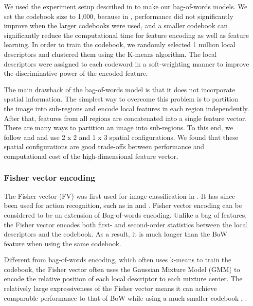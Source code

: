 We used the experiment setup described in \cite{jiang2010representations} to make our bag-of-words models. We set the codebook size to 1,000, because in \cite{jiang2010representations}, performance did not significantly improve when the larger codebooks were used, and a smaller codebook can significantly reduce the computational time for feature encoding as well as feature learning. In order to train the codebook, we randomly selected 1 million local descriptors and clustered them using the K-means algorithm. The local descriptors were assigned to each codeword in a soft-weighting manner \cite{jiang2007towards} to improve the discriminative power of the encoded feature.

The main drawback of the bag-of-words model is that it does not incorporate spatial information. The simplest way to overcome this problem is to partition the image into sub-regions and encode local features in each region independently. After that, features from all regions are concatenated into a single feature vector. There are many ways to partition an image into sub-regions. To this end, we follow \cite{jiang2010representations} and \cite{lazebnik2006beyond} and use 2 x 2 and 1 x 3 spatial configurations. We found that these spatial configurations are good trade-offs between performance and computational cost of the high-dimensional feature vector.

\subsubsection{Fisher vector encoding}
The Fisher vector (FV) was first used for image classification in \cite{jaakkola1999exploiting}. It has since been used for action recognition, such as in \cite{sun2013large} and \cite{wang2013action}. Fisher vector encoding can be considered to be an extension of Bag-of-words encoding. Unlike a bag of features, the Fisher vector encodes both first- and second-order statistics between the local descriptors and the codebook. As a result, it is much longer than the BoW feature when using the same codebook. 

  

Different from bag-of-words encoding, which often uses k-means to train the codebook, the Fisher vector often uses the Gaussian Mixture Model (GMM) to encode the relative position of each local descriptor to each mixture center. The relatively large expressiveness of the Fisher vector means it can achieve comparable performance to that of BoW while using a much smaller codebook \cite{sanchez2013image}, \cite{sun2013large}.

